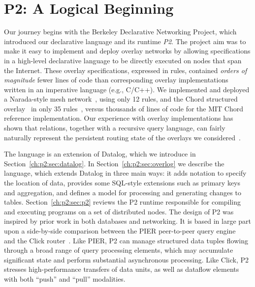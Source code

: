 \chapter[P2: A Logical Beginning]{P2: A Logical Beginning}
\label{ch:p2}

Our journey begins with the Berkeley Declarative Networking Project, which
introduced our declarative language {\em \OVERLOG} and its runtime {\em P2}.
The project aim was to make it easy to implement and deploy overlay networks by
allowing specifications in a high-level declarative language to be directly
executed on nodes that span the Internet.  These overlay specifications,
expressed in \OVERLOG rules, contained {\em orders of magnitude} fewer lines of
code than corresponding overlay implementations written in an imperative
language (e.g., C/C++).  We implemented and deployed a Narada-style mesh
network~\cite{chu00case}, using only 12 rules, and the Chord structured
overlay~\cite{chord} in only 35 rules~\cite{p2:sosp}, versus thousands of lines
of code for the MIT Chord reference implementation.  Our experience with
overlay implementations has shown that relations, together with a recursive
query language, can fairly naturally represent the persistent routing state of
the overlays we considered~\cite{loo-sigmod06, p2:sosp}.

The \OVERLOG language is an extension of Datalog, which we introduce in
Section~\ref{ch:p2:sec:datalog}.  In Section~\ref{ch:p2:sec:overlog} we
describe the \OVERLOG language, which extends Datalog in three main ways: it
adds notation to specify the location of data, provides some SQL-style
extensions such as primary keys and aggregation, and defines a model for
processing and generating changes to tables.  Section~\ref{ch:p2:sec:p2}
reviews the P2 runtime responsible for compiling and executing \OVERLOG
programs on a set of distributed nodes.  The design of P2 was inspired by prior
work in both databases and networking.  It is based in large part upon a
side-by-side comparison between the PIER peer-to-peer query
engine~\cite{pier-cidr05} and the Click router~\cite{click-tocs}.  Like PIER,
P2 can manage structured data tuples flowing through a broad range of query
processing elements, which may accumulate significant state and perform
substantial asynchronous processing.  Like Click, P2 stresses high-performance
transfers of data units, as well as dataflow elements with both ``push'' and
``pull'' modalities.

